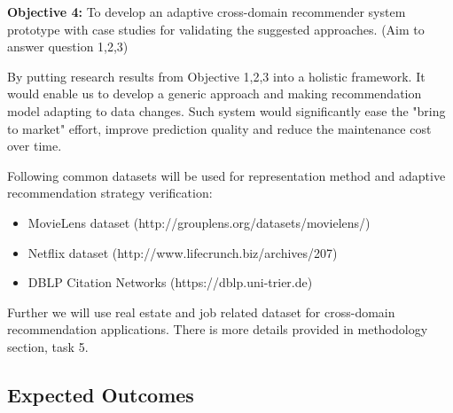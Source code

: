 \bigskip
\textbf{Objective 4:} To develop an adaptive cross-domain recommender system prototype with case studies for validating the suggested approaches. (Aim to answer question 1,2,3)

By putting research results from Objective 1,2,3 into a holistic framework. It would enable us to develop a generic approach and making recommendation model adapting to data changes. Such system would significantly ease the "bring to market" effort, improve prediction quality and reduce the maintenance cost over time. 

Following common datasets will be used for representation method and adaptive recommendation strategy verification: 
\begin{itemize}

\item MovieLens dataset (http://grouplens.org/datasets/movielens/) 

\item Netflix dataset (http://www.lifecrunch.biz/archives/207) 

\item DBLP Citation Networks (https://dblp.uni-trier.de)  

\end{itemize}

Further we will use real estate and job related dataset for cross-domain recommendation applications. There is more details provided in methodology section, task 5.


\subsection{Expected Outcomes}


